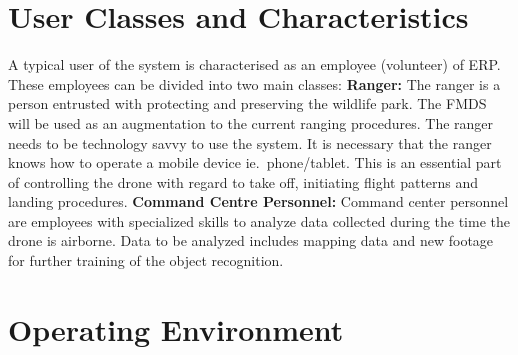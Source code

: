 \section{User Classes and Characteristics}

\begin{flushleft}
	A typical user of the system is characterised as an employee (volunteer) of ERP. 
	These employees can be divided into two main classes:
	\newline
	\newline
	\textbf{Ranger:}
	\newline
	The ranger is a person entrusted with protecting and preserving the wildlife park. 
	The FMDS will be used as an augmentation to the current ranging procedures. 
	The ranger needs to be technology savvy to use the system.
	It is necessary that the ranger knows how to operate a mobile device ie.\ phone/tablet.
	This is an essential part of controlling the drone with regard to take off, initiating flight patterns and landing procedures.
	\newline
	\newline
	\textbf{Command Centre Personnel:}
	\newline
	Command center personnel are employees with specialized skills to analyze data collected during the time the drone is airborne. 
	Data to be analyzed includes mapping data and new footage for further training of the object recognition.
	
	
\end{flushleft}

\section{Operating Environment}


